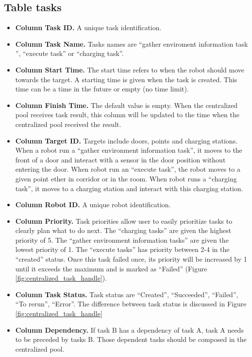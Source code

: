 \subsection*{Table tasks}
\begin{itemize}
    \label{sec:task_table}
    \item \textbf{Column Task ID.} A unique task identification.
    \item \textbf{Column Task Name.} Tasks names are ``gather enviroment information task '', ``execute task'' or ``charging task''.
    \item \textbf{Column Start Time.} The start time refers to when the robot should move towards the target. A starting time is given when the task is created. This time can be a time in the future or empty (no time limit). 
    \item \textbf{Column Finish Time.} The default value is empty. When the centralized pool receives task result, this column will be updated to the time when the centralized pool received the result.
    \item \textbf{Column Target ID.} Targets include doors, points and charging stations. When a robot run a ``gather environment information task'', it moves to the front of a door and interact with a sensor in the door position without entering the door. 
    When robot run an ``execute task'', the robot moves to a given point ether in corridor or in the room. When robot runs a ``charging task'', it moves to a charging station and interact with this charging station.
    \item \textbf{Column Robot ID.} A unique robot identification.
    \item \textbf{Column Priority.} Task priorities allow user to easily prioritize tasks to clearly plan what to do next. The ``charging tasks'' are given the highest priority of 5. The ``gather environment information tasks'' are given the lowest priority of 1. The ``execute tasks'' has priority between 2-4 in the ``created'' status. Once this task failed once, its priority will be increased by 1 until it exceeds the maximum and is marked as ``Failed'' (Figure \ref{fig:centralized_task_handle}).
    \item \textbf{Column Task Status.} Task status are ``Created'', ``Succeeded'', ``Failed'', ``To rerun'', ``Error''. The difference between task status is discussed in Figure \ref{fig:centralized_task_handle}
    \item \textbf{Column Dependency.} If task B has a dependency of task A, task A needs to be preceded by tasks B. Those dependent tasks should be composed in the centralized pool.

\end{itemize}
